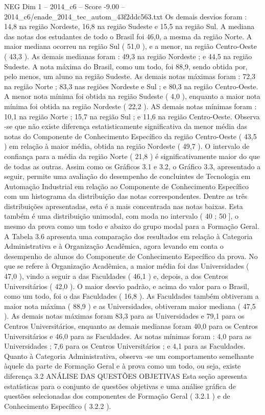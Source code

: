 \begin{textsample}{NEG Dim 1 – 2014\_c6 – Score -9.00 – 2014\_c6/enade\_2014\_tec\_autom\_43f2ddc563.txt}
Os demais desvios foram : 14,8 na região Nordeste, 16,8 na região Sudeste e 15,5 na região Sul.
A mediana das notas dos estudantes de todo o Brasil foi 46,0, a mesma da região Norte.
A maior mediana ocorreu na região Sul ( 51,0 ), e a menor, na região Centro-Oeste ( 43,3 ).
As demais medianas foram : 49,3 na região Nordeste ; e 44,5 na região Sudeste.
A nota máxima do Brasil, como um todo, foi 88,9, sendo obtida por, pelo menos, um aluno na região Sudeste.
As demais notas máximas foram : 72,3 na região Norte ; 83,3 nas regiões Nordeste e Sul ; e 80,3 na região Centro-Oeste.
A menor nota mínima foi obtida na região Sudeste ( 4,0 ), enquanto a maior nota mínima foi obtida na região Nordeste ( 22,2 ).
AS demais notas mínimas foram : 10,1 na região Norte ; 15,7 na região Sul ; e 11,6 na região Centro-Oeste.
Observa -se que não existe diferença estatisticamente significativa da menor média das notas do Componente de Conhecimento Específico da região Centro-Oeste ( 43,5 ) em relação à maior média, obtida na região Nordeste ( 49,7 ).
O intervalo de confiança para a média da região Norte ( 21,8 ) é significativamente maior do que de todas as outras.
Assim como os Gráficos 3.1 e 3.2, o Gráfico 3.3, apresentado a seguir, permite uma avaliação do desempenho de concluintes de Tecnologia em Automação Industrial em relação ao Componente de Conhecimento Específico com um histograma da distribuição das notas correspondentes.
Dentre as três distribuições apresentadas, esta é a mais concentrada nas notas baixas.
Esta também é uma distribuição unimodal, com moda no intervalo ( 40 ; 50 ], o mesmo da prova como um todo e abaixo do grupo modal para a Formação Geral.
A Tabela 3.6 apresenta uma comparação dos resultados em relação à Categoria Administrativa e à Organização Acadêmica, agora levando em conta o desempenho de alunos do Componente de Conhecimento Específico da prova.
No que se refere à Organização Acadêmica, a maior média foi das Universidades ( 47,0 ), vindo a seguir a das Faculdades ( 46,1 ) e, depois, a dos Centros Universitários ( 42,0 ).
O maior desvio padrão, e acima do valor para o Brasil, como um todo, foi o das Faculdades ( 16,8 ).
As Faculdades também obtiveram a maior nota máxima ( 88,9 ) e as Universidades, obtiveram maior mediana ( 47,5 ).
As demais notas máximas foram 83,3 para as Universidades e 79,1 para os Centros Universitários, enquanto as demais medianas foram 40,0 para os Centros Universitários e 46,0 para as Faculdades.
As notas mínimas foram : 4,0 para as Universidades ; 7,6 para os Centros Universitários ; e 4,1 para as Faculdades.
Quanto à Categoria Administrativa, observa -se um comportamento semelhante àquele da parte de Formação Geral e à prova como um todo, ou seja, existe diferença 3.2 ANÁLISE DAS QUESTÕES OBJETIVAS Esta seção apresenta estatísticas para o conjunto de questões objetivas e uma análise gráfica de questões selecionadas dos componentes de Formação Geral ( 3.2.1 ) e de Conhecimento Específico ( 3.2.2 ).

\end{textsample}
